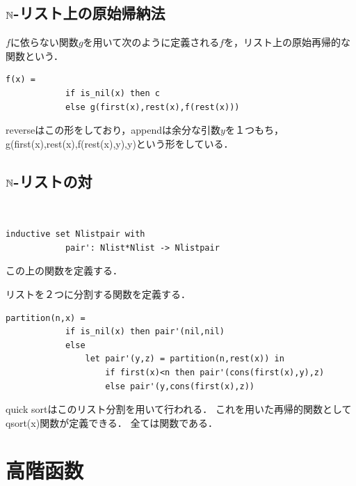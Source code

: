 \documentclass[uplatex, dvipdfmx]{jsreport}
\begin{document}
\subsection{$\mathbb{N}$-リスト上の原始帰納法}

\begin{definition}[リスト上の原始帰納法]
    $f$に依らない関数$g$を用いて次のように定義される$f$を，リスト上の原始再帰的な関数という．
    \begin{lstlisting}[caption=append]
        f(x) =
            if is_nil(x) then c
            else g(first(x),rest(x),f(rest(x)))
    \end{lstlisting}
    reverseはこの形をしており，appendは余分な引数$y$を１つもち，g(first(x),rest(x),f(rest(x),y),y)という形をしている．
\end{definition}

\subsection{$\mathbb{N}$-リストの対}

\begin{definition}　

    \begin{lstlisting}[caption=pair of Nlist]
        inductive set Nlistpair with
            pair': Nlist*Nlist -> Nlistpair
    \end{lstlisting}
\end{definition}

この上の関数を定義する．
\begin{example}[リスト分割]
    リストを２つに分割する関数を定義する．
    \begin{lstlisting}[caption=partition]
        partition(n,x) = 
            if is_nil(x) then pair'(nil,nil)
            else
                let pair'(y,z) = partition(n,rest(x)) in
                    if first(x)<n then pair'(cons(first(x),y),z)
                    else pair'(y,cons(first(x),z))
    \end{lstlisting}
\end{example}

\begin{application}
    quick sortはこのリスト分割を用いて行われる．
    これを用いた再帰的関数としてqsort(x)関数が定義できる．
    全ては関数である．
\end{application}

\section{高階函数}
\end{document}
